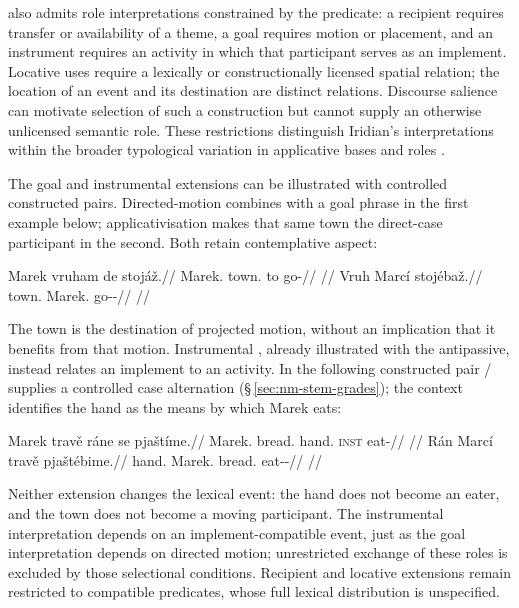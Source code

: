 also admits role interpretations constrained by the predicate:
a recipient requires transfer or availability of a theme, a goal requires
motion or placement, and an instrument requires an activity in which that
participant serves as an implement. Locative uses require a lexically or
constructionally licensed spatial relation; the location of an event and its
destination are distinct relations. Discourse salience can motivate selection
of such a construction but cannot supply an otherwise unlicensed semantic
role. These restrictions distinguish Iridian's interpretations within the
broader typological variation in applicative bases and roles
\cite[§§2, 4]{polinsky2013appl}.

The goal and instrumental extensions can be illustrated with controlled
constructed pairs. Directed-motion  combines with a goal phrase
in the first example below; applicativisation makes that same town the
direct-case participant in the second. Both retain contemplative aspect:

\pex\label{ex:val-appl-goal}
\a
\begingl
\gla Marek vruham de stojáž.//
\glb Marek.\Dir{} town.\Ind{} to go-\Ctpl{}//
\glft {}//
\endgl
\a
\begingl
\gla Vruh Marcí stojébaž.//
\glb town.\Dir{} Marek.\Ind{} go-\Appl{}-\Ctpl{}//
\glft {}//
\endgl
\xe

The town is the destination of projected motion, without an implication that
it benefits from that motion. Instrumental , already illustrated
with the antipassive, instead relates an implement to an activity. In the
following constructed pair / supplies a controlled
case alternation (§\,\ref{sec:nm-stem-grades}); the context identifies the
hand as the means by which Marek eats:

\pex\label{ex:val-appl-instrument}
\a
\begingl
\gla Marek travě ráne se pjaštíme.//
\glb Marek.\Dir{} bread.\Ind{} hand.\Ind{} \textsc{inst} eat-\Prog{}//
\glft {}//
\endgl
\a
\begingl
\gla Rán Marcí travě pjaštébime.//
\glb hand.\Dir{} Marek.\Ind{} bread.\Ind{} eat-\Appl{}-\Prog{}//
\glft {}//
\endgl
\xe

Neither extension changes the lexical event: the hand does not become an
eater, and the town does not become a moving participant. The instrumental
interpretation depends on an implement-compatible event, just as the goal
interpretation depends on directed motion; unrestricted exchange of these
roles is excluded by those selectional conditions. Recipient and locative
extensions remain restricted to compatible predicates, whose full lexical
distribution is unspecified.

